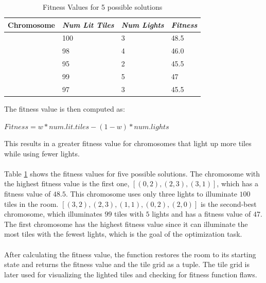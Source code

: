 \documentclass[conference]{IEEEtran}
\begin{document}
\begin{table}[htbp]
    \caption{Fitness Values for 5 possible solutions}
    \begin{center}
        \begin{tabular}{|p{3.0cm}|p{1.0cm}|p{1.5cm}|p{1.0cm}|}
            \hline
            \textbf{Chromosome} & \textbf{\textit{Num Lit Tiles}} & \textbf{\textit{Num Lights}} & \textbf{\textit{Fitness}} \\
            \hline
            [(0, 2), (2, 3), (3, 1)] & 100 & 3 & 48.5 \\
            \hline
            [(1, 0), (2, 2), (4, 1), (0, 4)] & 98 & 4 & 46.0 \\
            \hline
            [(0, 3), (2, 1)] & 95 & 2 & 45.5 \\
            \hline
            [(3, 2), (2, 3), (1, 1), (0, 2), (2, 0)] & 99 & 5 & 47 \\
            \hline
            [(1, 0), (3, 3), (0, 4)] & 97 & 3 & 45.5 \\
            \hline
        \end{tabular}
        \label{fitnes_table}
    \end{center}
\end{table}


The fitness value is then computed as:
\begin{center}
 $Fitness = w * num.lit.tiles - (1 - w) * num.lights$    
\end{center}
This results in a greater fitness value for chromosomes that light up more tiles while using fewer lights.
\\\\
Table \ref{fitnes_table} shows the fitness values for five possible solutions. The chromosome with the highest fitness value is the first one, $[(0, 2), (2, 3), (3, 1)]$, which has a fitness value of $48.5$. This chromosome uses only three lights to illuminate $100$ tiles in the room. $[(3, 2), (2, 3), (1, 1), (0, 2), (2, 0)]$ is the second-best chromosome, which illuminates $99$ tiles with $5$ lights and has a fitness value of $47$. The first chromosome has the highest fitness value since it can illuminate the most tiles with the fewest lights, which is the goal of the optimization task.\\
\\
After calculating the fitness value, the function restores the room to its starting state and returns the fitness value and the tile grid as a tuple. The tile grid is later used for visualizing the lighted tiles and checking for fitness function flaws.
\end{document}
